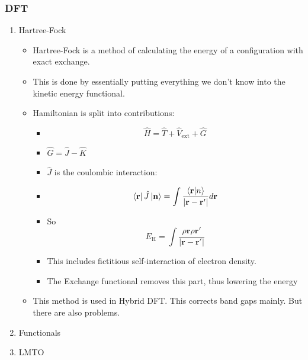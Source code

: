 \documentclass[11pt]{article}
\begin{document}
\subsubsection{DFT}
\label{sec:orgef40b38}
\begin{enumerate}
\item Hartree-Fock
\label{sec:org1c8ddac}
\begin{itemize}
\item Hartree-Fock is a method of calculating the energy of a configuration
with exact exchange.
\item This is done by essentially putting everything we don't know into the
kinetic energy functional.
\item Hamiltonian is split into contributions:
\begin{itemize}
\item \[\hat{H} = \hat{T} + \hat{V}_{ \text{ext} } + \hat{G}\]
\item \(\hat{G} = \hat{J} - \hat{K}\)
\item \(\hat{J}\) is the coulombic interaction:
\item \[ \bra{ \mathbf{r} } \hat{J} \ket{ \mathbf{n} } = \int \frac{ \bra{\mathbf{r}}\ket{n} }{|\mathbf{r} - \mathbf{r'}  |}d\mathbf{r} \]
\item So \[ E_{\text{H}} = \int \frac{\rho{\mathbf{r}\rho{\mathbf{r}'}}}{|\mathbf{r} - \mathbf{r'}|}\]
\item This includes fictitious self-interaction of electron density.
\item The Exchange functional removes this part, thus lowering the energy
\end{itemize}

\item This method is used in Hybrid DFT. This corrects band gaps mainly. But
there are also problems.
\end{itemize}

\item Functionals
\label{sec:org461d8ae}
\item LMTO
\label{sec:org6452d2c}
\end{enumerate}
\end{document}
